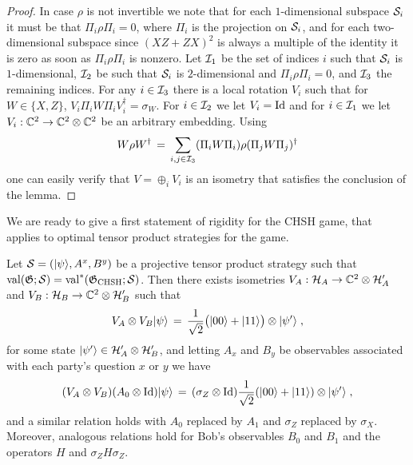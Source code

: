 \begin{proof}
In case $\rho$ is not invertible we note that for each $1$-dimensional subspace $\mathcal{S}_i$ it must be that $\Pi_i \rho \Pi_i=0$, where $\Pi_i$ is the projection on $\mathcal{S}_i$, and for each two-dimensional subspace since $(XZ+ZX)^2$ is always a multiple of the identity it is zero as soon as $\Pi_i\rho\Pi_i$ is nonzero. Let $\mathcal{I}_1$ be the set of indices $i$ such that $\mathcal{S}_i$ is $1$-dimensional, $\mathcal{I}_2$ be such that $\mathcal{S}_i$ is $2$-dimensional and $\Pi_i\rho\Pi_i= 0$, and $\mathcal{I}_3$ the remaining indices. For any $i\in \mathcal{I}_3$ there is a local rotation $V_i$ such that for $W\in\{X,Z\}$, $V_i \Pi_i W \Pi_i V_i^\dagger = \sigma_W$. For $i\in \mathcal{I}_2$ we let $V_i = \mathop{\rm Id}\nolimits$ and for $i\in \mathcal{I}_1$ we let $V_i : \mathbb{C}^2 \to \mathbb{C}^2 \otimes \mathbb{C}^2$ be an arbitrary embedding. Using 
\[W\rho W^\dagger \,=\, \sum_{i,j\in \mathcal{I}_3} (\Pi_iW\Pi_i) \rho (\Pi_j W \Pi_j)^\dagger \]
one can easily verify that $V = \oplus_i V_i$ is an isometry that satisfies the conclusion of the lemma. 
\end{proof}

We are ready to give a first statement of rigidity for the CHSH game, that applies to optimal tensor product strategies for the game. 

\begin{lemma}\label{lemma-rigid-chsh-exact}
Let $\mathcal{S} = (|\psi\rangle,A^x,B^y)$ be a projective tensor product strategy such that $\mathrm{val}(\mathfrak{G};\mathcal{S})=\mathrm{val}^*(\mathfrak{G}_{\mathrm{CHSH}};\mathcal{S})$. Then there exists isometries $V_A:\mathcal{H}_A \to \mathbb{C}^2 \otimes \mathcal{H}'_A$ and $V_B:\mathcal{H}_B \to \mathbb{C}^2 \otimes \mathcal{H}'_B$ such that 
\begin{equation}\label{equation-chsh-state-0}
 V_A \otimes V_B |\psi\rangle \,=\, \frac{1}{\sqrt{2}}\big(|00\rangle+|11\rangle\big) \otimes |\psi'\rangle\;,
\end{equation}
for some state $|\psi'\rangle \in \mathcal{H}'_A \otimes \mathcal{H}'_B$,
and letting $A_x$ and $B_y$ be observables associated with each party's question $x$ or $y$ we have
\begin{equation}\label{equation-chsh-alice}
( V_A \otimes V_B)( A_0 \otimes \mathop{\rm Id}\nolimits )|\psi\rangle \,=\, (\sigma_Z \otimes \mathop{\rm Id}\nolimits)\frac{1}{\sqrt{2}}(|00\rangle+|11\rangle) \otimes |\psi'\rangle  \;,
\end{equation}
and a similar relation holds with $A_0$ replaced by $A_1$ and $\sigma_Z$ replaced by $\sigma_X$. Moreover, analogous relations hold for Bob's observables $B_0$ and $B_1$ and the operators $H$ and $\sigma_Z H\sigma_Z$. 
\end{lemma}


